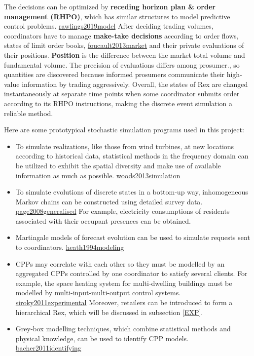\documentclass[letterpaper,8pt,twocolumn,twoside,]{pinp}
\providecommand{\tightlist}{%
  \setlength{\itemsep}{0pt}\setlength{\parskip}{0pt}}
\begin{document}
The decisions can be optimized by \textbf{receding horizon plan \& order
management (RHPO)}, which has similar structures to model predictive
control problems. \protect\hyperlink{reference}{rawlings2019model} After
deciding trading volumes, coordinators have to manage \textbf{make-take
decisions} according to order flows, states of limit order books,
\protect\hyperlink{reference}{foucault2013market} and their private
evaluations of their positions. \textbf{Position} is the difference
between the market total volume and fundamental volume. The precision of
evaluations differs among prosumer., so quantities are discovered
because informed prosumers communicate their high-value information by
trading aggressively. Overall, the states of Rex are changed
instantaneously at separate time points when some coordinator submits
order according to its RHPO instructions, making the discrete event
simulation a reliable method.

Here are some prototypical stochastic simulation programs used in this
project:

\begin{itemize}
\tightlist
\item
  To simulate realizations, like those from wind turbines, at new
  locations according to historical data, statistical methods in the
  frequency domain can be utilized to exhibit the spatial diversity and
  make use of available information as much as possible.
  \protect\hyperlink{reference}{woods2013simulation}
\item
  To simulate evolutions of discrete states in a bottom-up way,
  inhomogeneous Markov chains can be constructed using detailed survey
  data. \protect\hyperlink{reference}{page2008generalised} For example,
  electricity consumptions of residents associated with their occupant
  presences can be obtained.
\item
  Martingale models of forecast evolution can be used to simulate
  requests sent to coordinators.
  \protect\hyperlink{reference}{heath1994modeling}
\item
  CPPs may correlate with each other so they must be modelled by an
  aggregated CPPs controlled by one coordinator to satisfy several
  clients. For example, the space heating system for multi-dwelling
  buildings must be modelled by multi-input-multi-output control
  systems. \protect\hyperlink{reference}{siroky2011experimental}
  Moreover, retailers can be introduced to form a hierarchical Rex,
  which will be discussed in subsection \ref{EXP}.
\item
  Grey-box modelling techniques, which combine statistical methods and
  physical knowledge, can be used to identify CPP models.
  \protect\hyperlink{reference}{bacher2011identifying}
\end{itemize}
\end{document}
